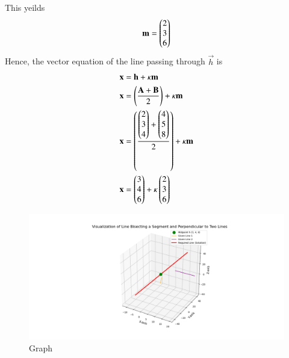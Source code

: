 \documentclass[journal]{IEEEtran}
\begin{document}
This yeilds
\begin{align}
    \mathbf{m} = \begin{pmatrix}2 \\ 3 \\ 6\end{pmatrix}
\end{align}
Hence, the vector equation of the line passing through $\vec{h}$ is 
\begin{align}
    \mathbf{x} &= \mathbf{h} + \kappa \mathbf{m}\\
    \mathbf{x} &= \left(\frac{\mathbf{A} + \mathbf{B}}{2}\right) + \kappa \mathbf{m}\\
    \mathbf{x} &= \left(\frac{\begin{pmatrix}2 \\ 3 \\ 4\end{pmatrix} + \begin{pmatrix}4 \\ 5 \\ 8\end{pmatrix}}{2}\right) + \kappa \mathbf{m}\\
    \mathbf{x} &= \begin{pmatrix}3 \\ 4 \\ 6\end{pmatrix} + \kappa \begin{pmatrix}2 \\ 3 \\ 6\end{pmatrix}
\end{align}

\begin{figure}[h]
    \centering
    \includegraphics[width=\columnwidth]{figs/figure_py.png}
    \caption{Graph}
    \label{fig:fig}
 \end{figure}
\end{document}
